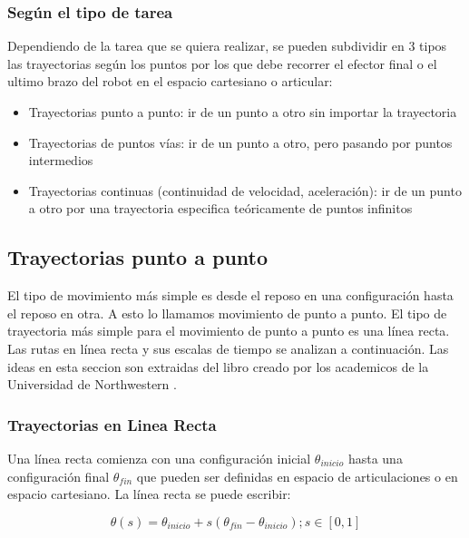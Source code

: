         \subsubsection{Según el tipo de tarea }
            Dependiendo de la tarea que se quiera realizar, se pueden subdividir en 3 tipos las trayectorias según los puntos por los que debe recorrer el efector final o el ultimo brazo del robot en el espacio cartesiano o articular:

            \begin{itemize}
                \item 	 Trayectorias punto a punto: ir de un punto a otro sin importar la trayectoria 
                \item 	 Trayectorias de puntos vías: ir de un punto a otro, pero pasando por puntos intermedios
                \item 	 Trayectorias continuas (continuidad de velocidad, aceleración): ir de un punto a otro por una trayectoria especifica teóricamente de puntos infinitos
            \end{itemize}
        

    \subsection{Trayectorias punto a punto}
        El tipo de movimiento más simple es desde el reposo en una configuración hasta el reposo en otra. A esto lo llamamos movimiento de punto a punto. El tipo de trayectoria más simple para el movimiento de punto a punto es una línea recta. Las rutas en línea recta y sus escalas de tiempo se analizan a continuación. Las ideas en esta seccion son extraidas del libro creado por los academicos de la Universidad de Northwestern  \cite{moder_robot}.
    
        \subsubsection{Trayectorias en Linea Recta}
            Una línea recta comienza con una configuración inicial $\theta_{inicio}$ hasta una configuración final $\theta_{fin}$ que pueden ser definidas en espacio de articulaciones o en espacio cartesiano. La línea recta se puede escribir: 
        
            \begin{equation}
                \theta(s)= \theta_{inicio} + s(\theta_{fin}-\theta_{inicio}) ; s \in [0,1]
                \label{eq:cap4_tray_9}
             \end{equation}
            
